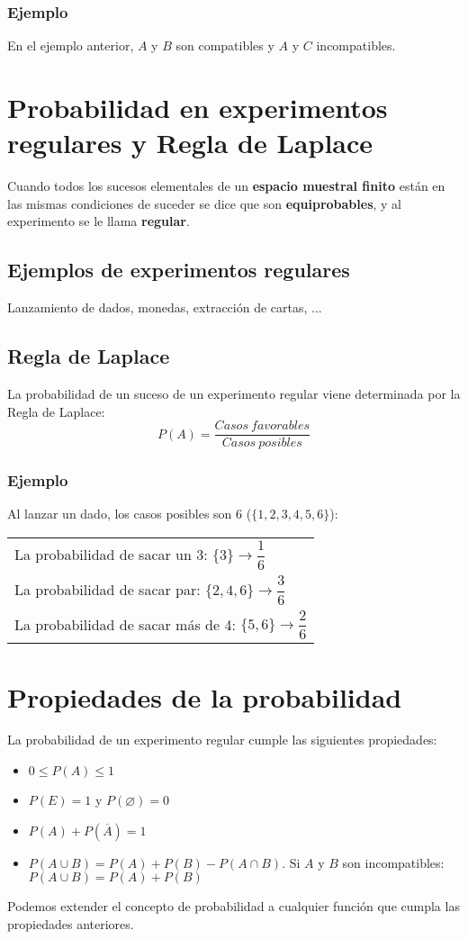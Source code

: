 \subsubsection{Ejemplo} En el ejemplo anterior, $A$ y $B$ son compatibles y $A$ y $C$ incompatibles.


\section{Probabilidad en experimentos regulares y Regla de Laplace} Cuando todos los sucesos elementales de un \textbf{espacio muestral finito} están en las mismas condiciones de suceder se dice que son \textbf{equiprobables}, y al experimento se le llama \textbf{regular}.
\subsection{Ejemplos de experimentos regulares} Lanzamiento de dados, monedas, extracción de cartas, ...

\subsection{Regla de Laplace} La probabilidad de un suceso de un experimento regular viene determinada por la Regla de Laplace:
$$P(A)=\dfrac{Casos\ favorables}{Casos\ posibles} $$
\subsubsection{Ejemplo}
Al lanzar un dado, los casos posibles son 6 ($\lbrace1,2,3,4,5,6\rbrace$):\\
\begin{tabular}{l}
La probabilidad de sacar un 3: $\lbrace3\rbrace\to \dfrac{1}{6}$\\
La probabilidad de sacar par: $\lbrace2,4,6\rbrace\to\dfrac{3}{6}$ \\
La probabilidad de sacar más de 4: $\lbrace5,6\rbrace\to\dfrac{2}{6}$
\end{tabular}

\section{Propiedades de la probabilidad} La probabilidad de un experimento regular cumple las siguientes propiedades:
\begin{itemize}
\item $0 \leq P(A) \leq 1$ 
\item $P(E) = 1$ y $P(\varnothing) = 0$
\item $P(A) + P(\overline A) = 1$
\item $P(A \cup B) = P(A) + P(B) - P(A \cap B)$. Si $A$ y $B$ son incompatibles: $P(A \cup B) = P(A) + P(B)$
\end{itemize}
Podemos extender el concepto de probabilidad a cualquier función que cumpla las propiedades anteriores.  

